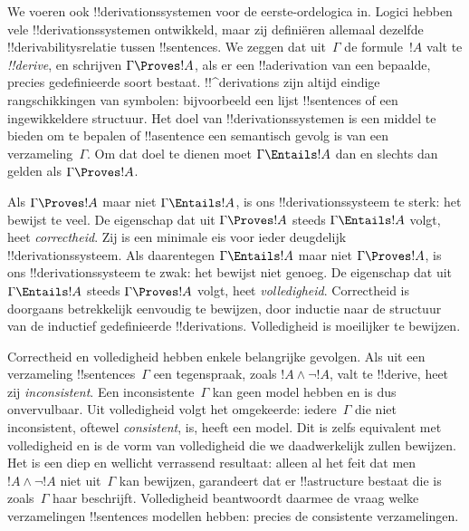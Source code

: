 \documentclass[../../../include/open-logic-section]{subfiles}
\begin{document}


We voeren ook !!{derivation}ssystemen voor de eerste-ordelogica in.
Logici hebben vele !!{derivation}ssystemen ontwikkeld, maar zij
definiëren allemaal dezelfde !!{derivability}srelatie tussen
!!{sentence}s. We zeggen dat uit~$\Gamma$ de formule~$!A$ valt te
\emph{!!{derive}}, en schrijven $\Gamma \Proves !A$, als er een
!!a{derivation} van een bepaalde, precies gedefinieerde soort bestaat.
!!^{derivation}s zijn altijd eindige rangschikkingen van symbolen:
bijvoorbeeld een lijst !!{sentence}s of een ingewikkeldere structuur.
Het doel van !!{derivation}ssystemen is een middel te bieden om te
bepalen of !!a{sentence} een semantisch gevolg is van een
verzameling~$\Gamma$. Om dat doel te dienen moet $\Gamma \Entails !A$
dan en slechts dan gelden als $\Gamma \Proves !A$.

Als $\Gamma \Proves !A$ maar niet $\Gamma \Entails !A$, is ons
!!{derivation}ssysteem te sterk: het bewijst te veel. De eigenschap dat
uit $\Gamma \Proves !A$ steeds $\Gamma \Entails !A$ volgt, heet
\emph{correctheid}. Zij is een minimale eis voor ieder deugdelijk
!!{derivation}ssysteem. Als daarentegen $\Gamma \Entails !A$ maar niet
$\Gamma \Proves !A$, is ons !!{derivation}ssysteem te zwak: het bewijst
niet genoeg. De eigenschap dat uit $\Gamma \Entails !A$ steeds
$\Gamma \Proves !A$ volgt, heet \emph{volledigheid}. Correctheid is
doorgaans betrekkelijk eenvoudig te bewijzen, door inductie naar de
structuur van de inductief gedefinieerde !!{derivation}s. Volledigheid
is moeilijker te bewijzen.

Correctheid en volledigheid hebben enkele belangrijke gevolgen. Als uit
een verzameling !!{sentence}s~$\Gamma$ een tegenspraak, zoals
$!A \land \lnot !A$, valt te !!{derive}, heet zij \emph{inconsistent}.
Een inconsistente~$\Gamma$ kan geen model hebben en is dus
onvervulbaar. Uit volledigheid volgt het omgekeerde: iedere~$\Gamma$ die
niet inconsistent, oftewel \emph{consistent}, is, heeft een model. Dit
is zelfs equivalent met volledigheid en is de vorm van volledigheid die
we daadwerkelijk zullen bewijzen. Het is een diep en wellicht
verrassend resultaat: alleen al het feit dat men
$!A \land \lnot !A$ niet uit~$\Gamma$ kan bewijzen, garandeert dat er !!a{structure}
bestaat die is zoals~$\Gamma$ haar beschrijft. Volledigheid beantwoordt
daarmee de vraag welke verzamelingen !!{sentence}s modellen hebben:
precies de consistente verzamelingen.
\end{document}
